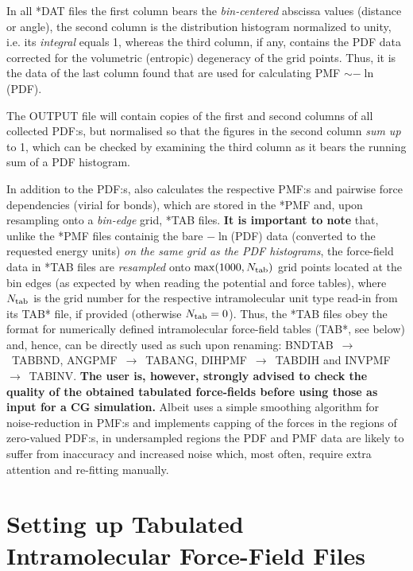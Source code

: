 In all *DAT files the first column bears the {\em bin-centered}
abscissa values (distance or angle), the second column is the distribution 
histogram normalized to unity, i.e. its {\em integral} equals 1, whereas 
the third column, if any, contains the PDF data corrected for the volumetric 
(entropic) degeneracy of the grid points. Thus, it is the data of the last 
column found that are used for calculating PMF $\sim -\ln$(PDF).

The OUTPUT file will contain copies of the first and second 
columns of all collected PDF:s, but normalised so that the figures 
in the second column {\em sum up} to 1, which can be checked 
by examining the third column as it bears the running sum of 
a PDF histogram.

In addition to the PDF:s, \D also calculates the respective PMF:s and 
pairwise force dependencies (virial for bonds), which are stored in 
the *PMF and, upon resampling onto a {\em bin-edge} grid, *TAB files. 
{\bf It is important to note} that, unlike the *PMF files containig 
the bare $-\ln$(PDF) data (converted to the requested energy units) 
{\em on the same grid as the PDF histograms}, the force-field data 
in *TAB files are {\em resampled} onto $\max(1000,N_{\rm tab})$ grid points 
located at the bin edges (as expected by \D when reading the potential 
and force tables), where $N_{\rm tab}$ is the grid number for 
the respective intramolecular unit type read-in from its TAB* file, 
if provided (otherwise $N_{\rm tab}=0$). Thus, the *TAB files obey 
the \D format for numerically defined intramolecular force-field tables 
(TAB*, see below) and, hence, can be directly used as such upon renaming: 
BNDTAB~$\to$~TABBND, ANGPMF~$\to$~TABANG, DIHPMF~$\to$~TABDIH and INVPMF~$\to$~TABINV. 
{\bf The user is, however, strongly advised to check the quality 
of the obtained tabulated force-fields before using those as input 
for a CG simulation.} Albeit \D uses a simple smoothing algorithm 
for noise-reduction in PMF:s and implements capping of the forces 
in the regions of zero-valued PDF:s, in undersampled regions the PDF 
and PMF data are likely to suffer from inaccuracy and increased noise 
which, most often, require extra attention and re-fitting manually. 


\section{Setting up Tabulated Intramolecular Force-Field Files}
\label{bonded-tables}

